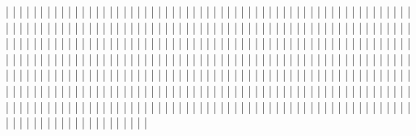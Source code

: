 |         |
|         |
|         |
|         |
|         |
|         |
|         |
|         |
|         |
|         |
|         |
|         |
|         |
|         |
|         |
|         |
|         |
|         |
|         |
|         |
|         |
|         |
|         |
|         |
|         |
|         |
|         |
|         |
|         |
|         |
|         |
|         |
|         |
|         |
|         |
|         |
|         |
|         |
|         |
|         |
|         |
|         |
|         |
|         |
|         |
|         |
|         |
|         |
|         |
|         |
|         |
|         |
|         |
|         |
|         |
|         |
|         |
|         |
|         |
|         |
|         |
|         |
|         |
|         |
|         |
|         |
|         |
|         |
|         |
|         |
|         |
|         |
|         |
|         |
|         |
|         |
|         |
|         |
|         |
|         |
|         |
|         |
|         |
|         |
|         |
|         |
|         |
|         |
|         |
|         |
|         |
|         |
|         |
|         |
|         |
|         |
|         |
|         |
|         |
|         |
|         |
|         |
|         |
|         |
|         |
|         |
|         |
|         |
|         |
|         |
|         |
|         |
|         |
|         |
|         |
|         |
|         |
|         |
|         |
|         |
|         |
|         |
|         |
|         |
|         |
|         |
|         |
|         |
|         |
|         |
|         |
|         |
|         |
|         |
|         |
|         |
|         |
|         |
|         |
|         |
|         |
|         |
|         |
|         |
|         |
|         |
|         |
|         |
|         |
|         |
|         |
|         |
|         |
|         |
|         |
|         |
|         |
|         |
|         |
|         |
|         |
|         |
|         |
|         |
|         |
|         |
|         |
|         |
|         |
|         |
|         |
|         |
|         |
|         |
|         |
|         |
|         |
|         |
|         |
|         |
|         |
|         |
|         |
|         |
|         |
|         |
|         |
|         |
|         |
|         |
|         |
|         |
|         |
|         |
|         |
|         |
|         |
|         |
|         |
|         |
|         |
|         |
|         |
|         |
|         |
|         |
|         |
|         |
|         |
|         |
|         |
|         |
|         |
|         |
|         |
|         |
|         |
